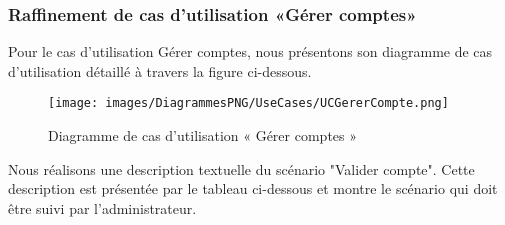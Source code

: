 {\subsubsection{Raffinement de cas d'utilisation «Gérer comptes»}
Pour le cas d'utilisation Gérer comptes, nous présentons son diagramme de cas d'utilisation détaillé à travers la figure ci-dessous.
\begin{figure}[H]
\centering
\texttt{[image: images/DiagrammesPNG/UseCases/UCGererCompte.png]}
\caption{Diagramme de cas d'utilisation « Gérer comptes »}
\end{figure}
Nous réalisons une description textuelle du scénario "Valider compte". Cette description est présentée par le tableau ci-dessous et montre le scénario qui doit être suivi par l'administrateur.\\

}
